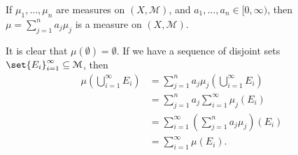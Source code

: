 \documentclass[10pt]{mypackage}
\begin{document}
\begin{exercise}[Exercise 7]
  If $\mu_1,\dots,\mu_n$ are measures on $\left(X,\mathcal{M}\right)$, and $a_1,\dots,a_n\in [0,\infty)$, then $\mu = \sum_{j=1}^{n}a_j\mu_j$ is a measure on $\left(X,\mathcal{M}\right)$.
\end{exercise}
\begin{solution}
  It is clear that $\mu\left(\emptyset\right) = \emptyset$. If we have a sequence of disjoint sets $\set{E_i}_{i=1}^{\infty}\subseteq \mathcal{M}$, then
  \begin{align*}
    \mu\left(\bigcup_{i=1}^{\infty}E_i\right) &= \sum_{j=1}^{n}a_j\mu_j\left(\bigcup_{i=1}^{\infty}E_i\right)\\
                                              &= \sum_{j=1}^{n}a_j\sum_{i=1}^{\infty}\mu_j\left(E_i\right)\\
                                              &= \sum_{i=1}^{\infty}\left(\sum_{j=1}^{n}a_j\mu_j\right)\left(E_i\right)\\
                                              &= \sum_{i=1}^{\infty}\mu\left(E_i\right).
  \end{align*}
  
\end{solution}
\end{document}
